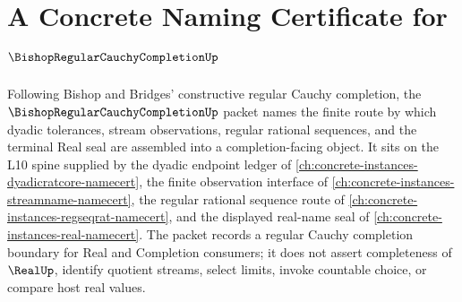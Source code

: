 \chapter{A Concrete Naming Certificate for $\BishopRegularCauchyCompletionUp$}
\label{ch:concrete-instances-bishop-regular-cauchy-completion-namecert}

Following Bishop and Bridges' constructive regular Cauchy completion, the $\BishopRegularCauchyCompletionUp$ packet names the finite route by which dyadic tolerances, stream observations, regular rational sequences, and the terminal Real seal are assembled into a completion-facing object. It sits on the L10 spine supplied by the dyadic endpoint ledger of \autoref{ch:concrete-instances-dyadicratcore-namecert}, the finite observation interface of \autoref{ch:concrete-instances-streamname-namecert}, the regular rational sequence route of \autoref{ch:concrete-instances-regseqrat-namecert}, and the displayed real-name seal of \autoref{ch:concrete-instances-real-namecert}. The packet records a regular Cauchy completion boundary for Real and Completion consumers; it does not assert completeness of $\RealUp$, identify quotient streams, select limits, invoke countable choice, or compare host real values.

